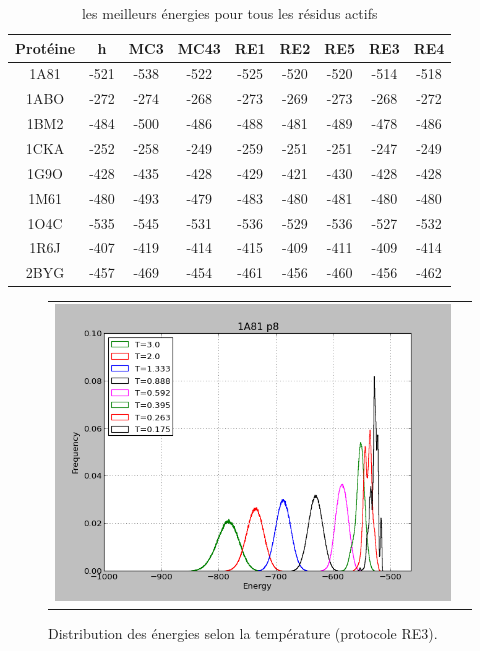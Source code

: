 \documentclass[a4paper,12pt]{article}
\begin{document}
    \begin{table}[!htbp]
      \centering

      \begin{tabular}{|c|c|c|c|c|c|c|c|c|}

        \hline
        Protéine & h & MC3 & MC43 & RE1 & RE2 & RE5 & RE3 & RE4 \\
        \hline
        1A81 & -521 & -538 & -522 & -525 & -520 & -520 & -514 & -518 \\
        1ABO & -272 & -274 & -268 & -273 & -269 & -273 & -268 & -272 \\
        1BM2 & -484 & -500 & -486 & -488 & -481 & -489 & -478 & -486 \\
        1CKA & -252 & -258 & -249 & -259 & -251 & -251 & -247 & -249 \\
        1G9O & -428 & -435 & -428 & -429 & -421 & -430 & -428 & -428 \\
        1M61 & -480 & -493 & -479 & -483 & -480 & -481 & -480 & -480 \\
        1O4C & -535 & -545 & -531 & -536 & -529 & -536 & -527 & -532 \\
        1R6J & -407 & -419 & -414 & -415 & -409 & -411 & -409 & -414 \\
        2BYG & -457 & -469 & -454 & -461 & -456 & -460 & -456 & -462 \\
        
        \hline

      \end{tabular}      
      \caption{les meilleurs énergies pour tous les résidus actifs}
      \label{tab_best_ener_all}      
    \end{table}


   \begin{figure}[t]
     \centering
     \begin{tabular}{cc}
       \includegraphics[width=12cm]{image/1A81_casa-p8.png} &
     \end{tabular}
     
     \caption{Distribution des énergies selon la température (protocole RE3).}
     \label{Distrib_E_RE3}
   \end{figure}
\end{document}
